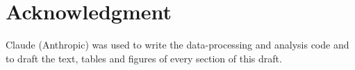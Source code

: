 \documentclass[conference,a4paper]{IEEEtran}
\begin{document}






\section*{Acknowledgment}
Claude (Anthropic) was used to write the data-processing and analysis code
and to draft the text, tables and figures of every section of this draft.

\small


\end{document}
